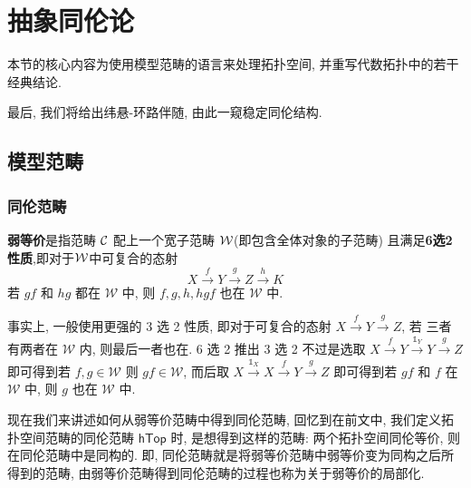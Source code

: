 \chapter{抽象同伦论}\label{抽象同伦论}
\begin{introduction}
    \item 本节的核心内容为使用模型范畴的语言来处理拓扑空间, 并重写代数拓扑中的若干经典结论.
    \item 最后, 我们将给出纬悬-环路伴随, 由此一窥稳定同伦结构.
\end{introduction}
\section{模型范畴}
\subsection{同伦范畴}
\begin{definition}[弱等价范畴]
    \textbf{弱等价}是指范畴 $\cal{C}$ 配上一个宽子范畴 $\cal{W}$(即包含全体对象的子范畴) 
    且满足\textbf{6选2性质},即对于$\cal{W}$中可复合的态射 
    \[
    X\xrightarrow{f}Y \xrightarrow{g}Z \xrightarrow{h} K
    \] 
    若 $gf$ 和 $hg$ 都在 $\mathcal{W}$ 中, 则 $f,g,h,hgf$ 也在 $\mathcal{W}$ 中.
\end{definition}
\begin{remark}
    事实上, 一般使用更强的 3 选 2 性质, 即对于可复合的态射 $X \xrightarrow{f} Y \xrightarrow{g} Z$, 若
    三者有两者在 $\mathcal{W}$ 内, 则最后一者也在. 6 选 2 推出 3 选 2 不过是选取 
    $X \xrightarrow{f} Y \xrightarrow{\mathbb{1}_Y} Y \xrightarrow{g} Z$
    即可得到若 $f, g \in \mathcal{W}$ 则 $gf\in \mathcal{W}$, 而后取 
    $X\xrightarrow{\mathbb{1}_X} X \xrightarrow{f}Y \xrightarrow{g} Z$ 
    即可得到若 $gf$ 和 $f$ 在 $\mathcal{W}$ 中, 则 $g$ 也在 $\mathcal{W}$ 中.
\end{remark}
现在我们来讲述如何从弱等价范畴中得到同伦范畴, 回忆到在前文中, 
我们定义拓扑空间范畴的同伦范畴 $\mathsf{hTop}$ 时, 是想得到这样的范畴: 两个拓扑空间同伦等价, 则在同伦范畴中是同构的.
即, 同伦范畴就是将弱等价范畴中弱等价变为同构之后所得到的范畴, 由弱等价范畴得到同伦范畴的过程也称为关于弱等价的局部化.
